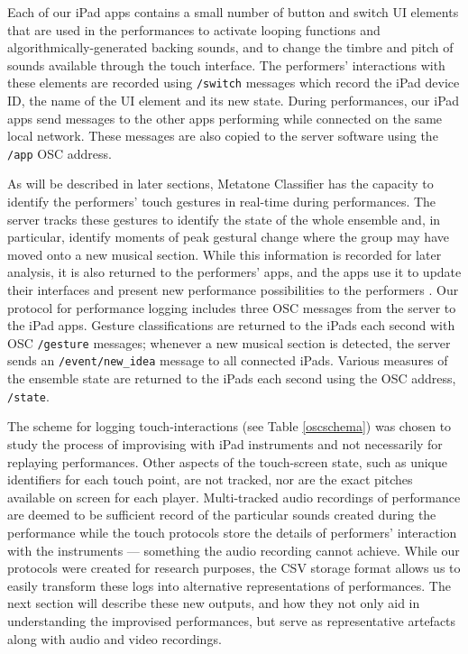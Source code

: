 \documentclass[graybox]{svmult}
\begin{document}
Each of our iPad apps contains a small number of button and switch UI
elements that are used in the performances to activate looping
functions and algorithmically-generated backing sounds, and to change the
timbre and pitch of sounds available through the touch interface. The
performers' interactions with these elements are recorded using
\texttt{/switch} messages which record the iPad device ID, the name of
the UI element and its new state. During performances, our iPad apps
send messages to the other apps performing while connected on the same
local network. These messages are also copied to the server software
using the \texttt{/app} OSC address.

As will be described in later sections, Metatone Classifier has the
capacity to identify the performers' touch gestures in real-time
during performances. The server tracks these gestures to identify the
state of the whole ensemble and, in particular, identify moments
of peak gestural change where the group may have moved onto a new
musical section. While this information is recorded for later
analysis, it is also returned to the performers' apps, and the apps use it to
update their interfaces and present new performance possibilities to
the performers \citep{Martin:2015jk}. Our protocol for performance
logging includes three OSC messages from the server to the iPad apps.
Gesture classifications are returned to the iPads each second with OSC
\texttt{/gesture} messages; whenever a new musical section is
detected, the server sends an \texttt{/event/new\_idea} message to all
connected iPads. Various measures of the ensemble state are
returned to the iPads each second using the OSC address,
\texttt{/state}.

The scheme for logging touch-interactions (see Table \ref{oscschema})
was chosen to study the process of improvising with iPad instruments
and not necessarily for replaying performances. Other aspects of the
touch-screen state, such as unique identifiers for each touch point, are
not tracked, nor are the exact pitches available on screen for each
player. Multi-tracked audio recordings of performance are deemed to be
sufficient record of the particular sounds created during the
performance while the touch protocols store the details of performers'
interaction with the instruments --- something the audio recording cannot achieve.
While our protocols were created for research purposes, the CSV
storage format allows us to easily transform these logs into
alternative representations of performances. The next section will
describe these new outputs, and how they not only aid in understanding
the improvised performances, but serve as representative artefacts
along with audio and video recordings.
\end{document}

